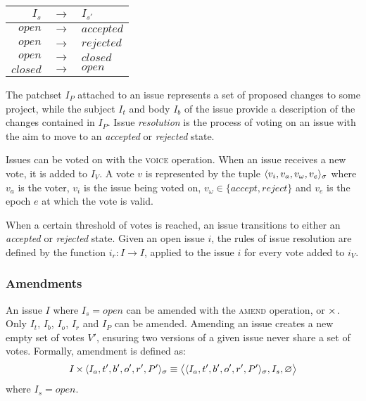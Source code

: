 \begin{fig}
    \centering
    \begin{tabular}{@{}rcl@{}}
        \toprule
        $I_s$      & $\to$ & $I_{s'}$ \\
        \midrule
        $open$     & $\to$ & $accepted$ \\
        $open$     & $\to$ & $rejected$ \\
        $open$     & $\to$ & $closed$ \\
        $closed$   & $\to$ & $open$ \\
        \bottomrule
    \end{tabular}
\end{fig}

The patchset $I_P$ attached to an issue represents a set of proposed changes to
some project, while the subject $I_t$ and body $I_b$ of the issue provide a
description of the changes contained in $I_P$. Issue \emph{resolution} is the
process of voting on an issue with the aim to move to an \emph{accepted} or
\emph{rejected} state.

Issues can be voted on with the \textsc{voice} operation. When an issue receives
a new vote, it is added to $I_V$. A vote $v$ is represented by the tuple
$\langle v_i, v_a, v_{\omega}, v_e \rangle_{\sigma}$ where $v_a$ is the voter,
$v_i$ is the issue being voted on, $v_{\omega} \in \{accept, reject\}$ and
$v_e$ is the epoch $e$ at which the vote is valid.

When a certain threshold of votes is reached, an issue transitions to either an
\emph{accepted} or \emph{rejected} state. Given an open issue $i$, the rules of
issue resolution are defined by the function $i_r : I \to I$, applied to the
issue $i$ for every vote added to $i_V$.

\subsubsection{Amendments}

An issue $I$ where $I_s = open$ can be amended with the \textsc{amend}
operation, or $\operatorname{\times}$. Only $I_t$, $I_b$, $I_o$, $I_r$ and $I_P$ can be
amended.  Amending an issue creates a new empty set of votes $V'$, ensuring two
versions of a given issue never share a set of votes. Formally, amendment is
defined as:
\begin{align*}
    I \operatorname{\times}{} \langle I_a, t', b', o', r', P' \rangle_{\sigma} \equiv
    \big<\langle I_a, t', b', o', r', P' \rangle_{\sigma}, I_s, \varnothing
    \big>
\end{align*}
where $I_s = open$.

